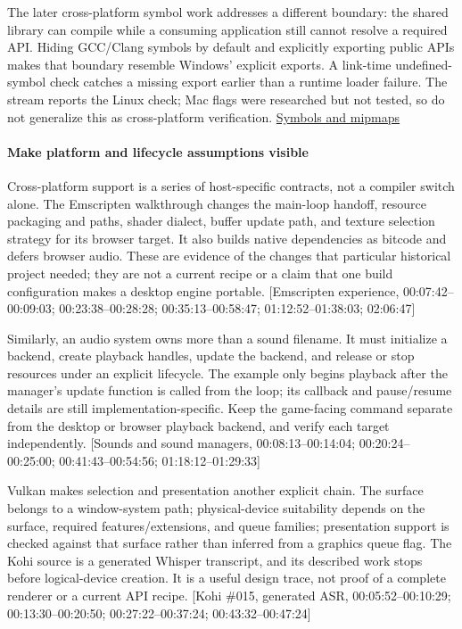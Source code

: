 The later cross-platform symbol work addresses a different boundary: the shared library can compile while a consuming application still cannot resolve a required API. Hiding GCC/Clang symbols by default and explicitly exporting public APIs makes that boundary resemble Windows' explicit exports. A link-time undefined-symbol check catches a missing export earlier than a runtime loader failure. The stream reports the Linux check; Mac flags were researched but not tested, so do not generalize this as cross-platform verification. \href{https://www.youtube.com/watch?v=xb23Y9o7tP4}{Symbols and mipmaps}

\paragraph{Make platform and lifecycle assumptions visible}\label{make-platform-and-lifecycle-assumptions-visible}

Cross-platform support is a series of host-specific contracts, not a compiler switch alone. The Emscripten walkthrough changes the main-loop handoff, resource packaging and paths, shader dialect, buffer update path, and texture selection strategy for its browser target. It also builds native dependencies as bitcode and defers browser audio. These are evidence of the changes that particular historical project needed; they are not a current recipe or a claim that one build configuration makes a desktop engine portable. {[}Emscripten experience, 00:07:42--00:09:03; 00:23:38--00:28:28; 00:35:13--00:58:47; 01:12:52--01:38:03; 02:06:47{]}

Similarly, an audio system owns more than a sound filename. It must initialize a backend, create playback handles, update the backend, and release or stop resources under an explicit lifecycle. The example only begins playback after the manager's update function is called from the loop; its callback and pause/resume details are still implementation-specific. Keep the game-facing command separate from the desktop or browser playback backend, and verify each target independently. {[}Sounds and sound managers, 00:08:13--00:14:04; 00:20:24--00:25:00; 00:41:43--00:54:56; 01:18:12--01:29:33{]}

Vulkan makes selection and presentation another explicit chain. The surface belongs to a window-system path; physical-device suitability depends on the surface, required features/extensions, and queue families; presentation support is checked against that surface rather than inferred from a graphics queue flag. The Kohi source is a generated Whisper transcript, and its described work stops before logical-device creation. It is a useful design trace, not proof of a complete renderer or a current API recipe. {[}Kohi \#015, generated ASR, 00:05:52--00:10:29; 00:13:30--00:20:50; 00:27:22--00:37:24; 00:43:32--00:47:24{]}

